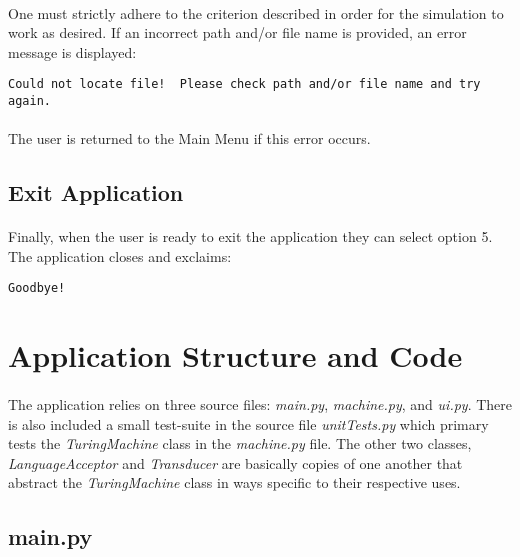 \documentclass[12pt]{article}
\begin{document}
\paragraph{}
One must strictly adhere to the criterion described in order for the simulation 
to work as desired.  If an incorrect path and/or file name is provided, an 
error message is displayed:

\begin{verbatim}
Could not locate file!  Please check path and/or file name and try again.
\end{verbatim}

\paragraph{}
The user is returned to the Main Menu if this error occurs.

\subsection{Exit Application}
\paragraph{}
Finally, when the user is ready to exit the application they can select option 
5.  The application closes and exclaims:

\begin{verbatim}
Goodbye!
\end{verbatim}

\section{Application Structure and Code}
\paragraph{}
The application relies on three source files: \textit{main.py}, \textit{machine.py}, 
and \textit{ui.py}.  There is also included a small test-suite in the source 
file \textit{unitTests.py} which primary tests the \textit{TuringMachine} class 
in the \textit{machine.py} file.  The other two classes, \textit{LanguageAcceptor} 
and \textit{Transducer} are basically copies of one another that abstract the 
\textit{TuringMachine} class in ways specific to their respective uses.

\subsection{main.py}
\end{document}
